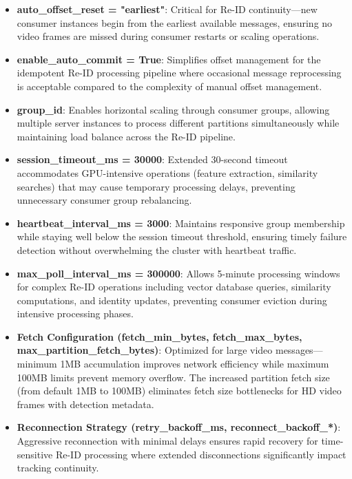 \documentclass[../main.tex]{subfiles}
\begin{document}
\begin{itemize}
    \item \textbf{auto\_offset\_reset = "earliest"}: Critical for Re-ID continuity—new consumer instances begin from the earliest available messages, ensuring no video frames are missed during consumer restarts or scaling operations.
    
    \item \textbf{enable\_auto\_commit = True}: Simplifies offset management for the idempotent Re-ID processing pipeline where occasional message reprocessing is acceptable compared to the complexity of manual offset management.
    
    \item \textbf{group\_id}: Enables horizontal scaling through consumer groups, allowing multiple server instances to process different partitions simultaneously while maintaining load balance across the Re-ID pipeline.
    
    \item \textbf{session\_timeout\_ms = 30000}: Extended 30-second timeout accommodates GPU-intensive operations (feature extraction, similarity searches) that may cause temporary processing delays, preventing unnecessary consumer group rebalancing.
    
    \item \textbf{heartbeat\_interval\_ms = 3000}: Maintains responsive group membership while staying well below the session timeout threshold, ensuring timely failure detection without overwhelming the cluster with heartbeat traffic.
    
    \item \textbf{max\_poll\_interval\_ms = 300000}: Allows 5-minute processing windows for complex Re-ID operations including vector database queries, similarity computations, and identity updates, preventing consumer eviction during intensive processing phases.
    
    \item \textbf{Fetch Configuration (fetch\_min\_bytes, fetch\_max\_bytes, max\_partition\_fetch\_bytes)}: Optimized for large video messages—minimum 1MB accumulation improves network efficiency while maximum 100MB limits prevent memory overflow. The increased partition fetch size (from default 1MB to 100MB) eliminates fetch size bottlenecks for HD video frames with detection metadata.
    
    \item \textbf{Reconnection Strategy (retry\_backoff\_ms, reconnect\_backoff\_*)}: Aggressive reconnection with minimal delays ensures rapid recovery for time-sensitive Re-ID processing where extended disconnections significantly impact tracking continuity.
\end{itemize}
\end{document}
